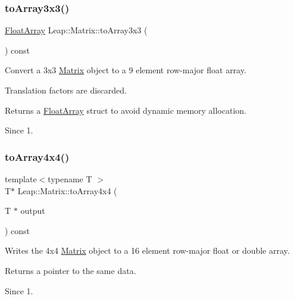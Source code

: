 \subsubsection{\texorpdfstring{to\+Array3x3()}{toArray3x3()}\hspace{0.1cm}{\footnotesize\ttfamily [2/2]}}
{\footnotesize\ttfamily \hyperlink{struct_leap_1_1_float_array}{Float\+Array} Leap\+::\+Matrix\+::to\+Array3x3 (\begin{DoxyParamCaption}{ }\end{DoxyParamCaption}) const\hspace{0.3cm}{\ttfamily [inline]}}

Convert a 3x3 \hyperlink{struct_leap_1_1_matrix}{Matrix} object to a 9 element row-\/major float array.

Translation factors are discarded.


\begin{DoxyCodeInclude}
\end{DoxyCodeInclude}


Returns a \hyperlink{struct_leap_1_1_float_array}{Float\+Array} struct to avoid dynamic memory allocation. \begin{DoxySince}{Since}
1. 
\end{DoxySince}
\mbox{\label{struct_leap_1_1_matrix_ab2a3581b5daee17470d91af3b20928ac}} 
\subsubsection{\texorpdfstring{to\+Array4x4()}{toArray4x4()}\hspace{0.1cm}{\footnotesize\ttfamily [1/2]}}
{\footnotesize\ttfamily template$<$typename T $>$ \\
T$\ast$ Leap\+::\+Matrix\+::to\+Array4x4 (\begin{DoxyParamCaption}\item[{T $\ast$}]{output }\end{DoxyParamCaption}) const\hspace{0.3cm}{\ttfamily [inline]}}

Writes the 4x4 \hyperlink{struct_leap_1_1_matrix}{Matrix} object to a 16 element row-\/major float or double array.

Returns a pointer to the same data. \begin{DoxySince}{Since}
1. 
\end{DoxySince}
\mbox{\label{struct_leap_1_1_matrix_a5faf9ff63d63ff95f6631606e610dc29}} 
